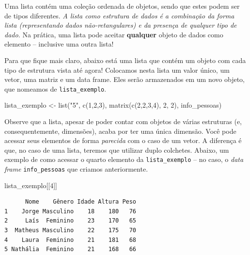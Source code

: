 \documentclass[
  letterpaper,
  DIV=11,
  numbers=noendperiod]{scrreprt}
\newenvironment{Shaded}{\begin{snugshade}}{\end{snugshade}}
\newcommand{\DecValTok}[1]{\textcolor[rgb]{0.68,0.00,0.00}{#1}}
\newcommand{\FunctionTok}[1]{\textcolor[rgb]{0.28,0.35,0.67}{#1}}
\newcommand{\NormalTok}[1]{\textcolor[rgb]{0.00,0.23,0.31}{#1}}
\newcommand{\OtherTok}[1]{\textcolor[rgb]{0.00,0.23,0.31}{#1}}
\newcommand{\StringTok}[1]{\textcolor[rgb]{0.13,0.47,0.30}{#1}}
\begin{document}
Uma lista contém uma coleção ordenada de objetos, sendo que estes podem
ser de tipos diferentes. \emph{A lista como estrutura de dados é a
combinação da forma lista (representando dados não-retangulares) e da
presença de qualquer tipo de dado.} Na prática, uma lista pode aceitar
\textbf{qualquer} objeto de dados como elemento -- inclusive uma outra
lista!

Para que fique mais claro, abaixo está uma lista que contém um objeto
com cada tipo de estrutura vista até agora! Colocamos nesta lista um
valor único, um vetor, uma matriz e um data frame. Eles serão
armazenados em um novo objeto, que nomeamos de \texttt{lista\_exemplo}.

\begin{Shaded}
\begin{Highlighting}[]
\NormalTok{lista\_exemplo }\OtherTok{\textless{}{-}} \FunctionTok{list}\NormalTok{(}\StringTok{"5"}\NormalTok{, }\FunctionTok{c}\NormalTok{(}\DecValTok{1}\NormalTok{,}\DecValTok{2}\NormalTok{,}\DecValTok{3}\NormalTok{), }\FunctionTok{matrix}\NormalTok{(}\FunctionTok{c}\NormalTok{(}\DecValTok{2}\NormalTok{,}\DecValTok{2}\NormalTok{,}\DecValTok{3}\NormalTok{,}\DecValTok{4}\NormalTok{), }\DecValTok{2}\NormalTok{, }\DecValTok{2}\NormalTok{), info\_pessoas)}
\end{Highlighting}
\end{Shaded}

Observe que a lista, apesar de poder contar com objetos de várias
estruturas (e, consequentemente, dimensões), acaba por ter uma única
dimensão. Você pode acessar seus elementos de forma \emph{parecida} com
o caso de um vetor. A diferença é que, no caso de uma lista, teremos que
utilizar duplo colchetes. Abaixo, um exemplo de como acessar o quarto
elemento da \texttt{lista\_exemplo} -- no caso, o \emph{data frame}
\texttt{info\_pessoas} que criamos anteriormente.

\begin{Shaded}
\begin{Highlighting}[]
\NormalTok{lista\_exemplo[[}\DecValTok{4}\NormalTok{]]}
\end{Highlighting}
\end{Shaded}

\begin{verbatim}
      Nome    Gênero Idade Altura Peso
1    Jorge Masculino    18    180   76
2     Laís  Feminino    23    170   65
3  Matheus Masculino    22    175   70
4    Laura  Feminino    21    181   68
5 Nathália  Feminino    21    168   66
\end{verbatim}
\end{document}
